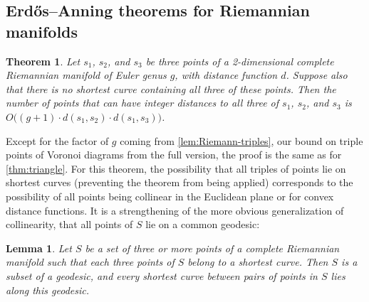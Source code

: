 \documentclass[11pt]{article}
\newtheorem{theorem}{Theorem}
\newtheorem{lemma}{Lemma}
\theoremstyle{definition}
\begin{document}
\subsection{Erd\H{o}s--Anning theorems for Riemannian manifolds}

\begin{theorem}
\label{thm:Riemann-triangle}
Let $s_1$, $s_2$, and $s_3$ be three points of a 2-dimensional complete Riemannian manifold of Euler genus $g$, with distance function $d$. Suppose also that there is no shortest curve containing all three of these points. Then the number of points that can have integer distances to all three of $s_1$, $s_2$, and $s_3$ is $O\bigl((g+1)\cdot d(s_1,s_2)\cdot d(s_1,s_3)\bigr)$.
\end{theorem}

Except for the factor of $g$ coming from
\iffull
\cref{lem:Riemann-triples},
\else
our bound on triple points of Voronoi diagrams from the full version,
\fi
the proof is the same as for \cref{thm:triangle}.
For this theorem, the possibility that all triples of points lie on shortest curves (preventing the theorem from being applied) corresponds to the possibility of all points being collinear in the Euclidean plane or for convex distance functions. It is a strengthening of the more obvious generalization of collinearity, that all points of $S$ lie on a common geodesic:

\begin{lemma}
\label{lem:Riemann-geodesic}
Let $S$ be a set of three or more points of a complete Riemannian manifold such that each three points of $S$ belong to a shortest curve.
Then $S$ is a subset of a geodesic, and every shortest curve between pairs of points in $S$ lies along this geodesic.
\end{lemma}
\end{document}
